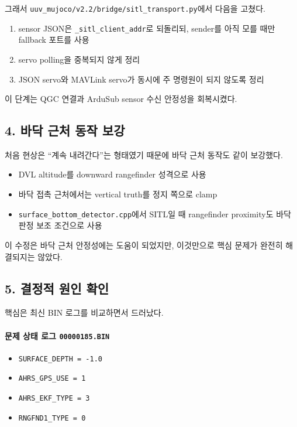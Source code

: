 \documentclass[11pt]{article}
\begin{document}
그래서 \texttt{uuv\_mujoco/v2.2/bridge/sitl\_transport.py}에서 다음을 고쳤다.

\begin{enumerate}[leftmargin=1.5em]
\item sensor JSON은 \texttt{\_sitl\_client\_addr}로 되돌리되,
      sender를 아직 모를 때만 fallback 포트를 사용
\item servo polling을 중복되지 않게 정리
\item JSON servo와 MAVLink servo가 동시에 주 명령원이 되지 않도록 정리
\end{enumerate}

이 단계는 QGC 연결과 ArduSub sensor 수신 안정성을 회복시켰다.

\subsection{4. 바닥 근처 동작 보강}

처음 현상은 ``계속 내려간다''는 형태였기 때문에 바닥 근처 동작도 같이 보강했다.

\begin{itemize}[leftmargin=1.5em]
\item DVL altitude를 downward rangefinder 성격으로 사용
\item 바닥 접촉 근처에서는 vertical truth를 정지 쪽으로 clamp
\item \texttt{surface\_bottom\_detector.cpp}에서 SITL일 때 rangefinder proximity도
      바닥 판정 보조 조건으로 사용
\end{itemize}

이 수정은 바닥 근처 안정성에는 도움이 되었지만, 이것만으로 핵심 문제가
완전히 해결되지는 않았다.

\subsection{5. 결정적 원인 확인}

핵심은 최신 BIN 로그를 비교하면서 드러났다.

\paragraph{문제 상태 로그 \texttt{00000185.BIN}}

\begin{itemize}[leftmargin=1.5em]
\item \texttt{SURFACE\_DEPTH = -1.0}
\item \texttt{AHRS\_GPS\_USE = 1}
\item \texttt{AHRS\_EKF\_TYPE = 3}
\item \texttt{RNGFND1\_TYPE = 0}
\end{itemize}
\end{document}
